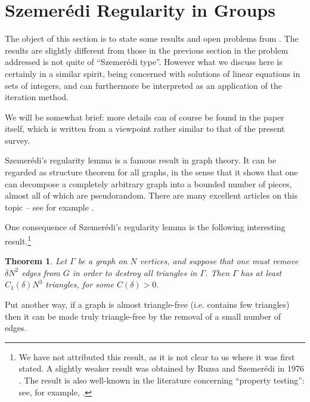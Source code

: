 \documentclass[12pt,a4paper,reqno]{amsart}
\numberwithin{equation}{section}
\theoremstyle{plain}
\newtheorem{theorem}[subsection]{Theorem}
\theoremstyle{definition}
\begin{document}
\section{Szemer\'edi Regularity in Groups}\label{sec7}

\noindent The object of this section is to state some results and open problems from  \cite{green-reg}. The results are slightly different from those in the previous section in the problem addressed is not quite of ``Szemer\'edi type''. However what we discuss here is certainly in a similar spirit, being concerned with solutions of linear equations in sets of integers, and can furthermore be interpreted as an application of the iteration method.\vspace{11pt}

\noindent We will be somewhat brief: more details can of course be found in the paper \cite{green-reg} itself, which is written from a viewpoint rather similar to that of the present survey.\vspace{11pt}

\noindent Szemer\'edi's regularity lemma is a famous result in graph theory. It can be regarded as structure theorem for all graphs, in the sense that it shows that one can decompose a completely arbitrary graph into a bounded number of pieces, almost all of which are pseudorandom. There are many excellent articles on this topic -- see for example \cite{komlos-simonovits}.\vspace{11pt}

\noindent One consequence of Szemer\'edi's regularity lemma is the following interesting result.\footnote{We have not attributed this result, as it is not clear to us where it was first stated. A slightly weaker result was obtained by Ruzsa and Szemer\'edi in 1976 \cite{ruz-szem}. The result is also well-known in the literature concerning ``property testing'': see, for example, \cite{alon-property-testing}.}
\begin{theorem} \label{ruz-szem-thm} Let $\Gamma$ be a graph on $N$ vertices, and suppose that one must remove $\delta N^2$ edges from $G$ in order to destroy all triangles in $\Gamma$. Then $\Gamma$ has at least $C_1(\delta) N^3$ triangles, for some $C(\delta) > 0$.
\end{theorem}
\noindent Put another way, if a graph is almost triangle-free (i.e. contains few triangles) then it can be made truly triangle-free by the removal of a small number of edges.\vspace{11pt}
\end{document}
